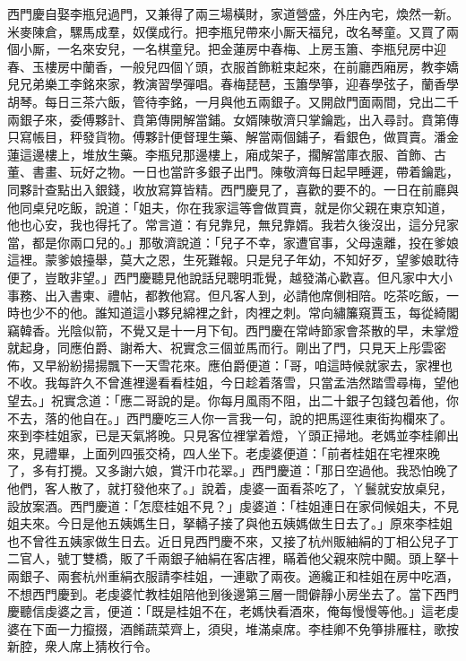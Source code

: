 西門慶自娶李瓶兒過門，又兼得了兩三場橫財，家道營盛，外庄內宅，煥然一新。米麥陳倉，騾馬成羣，奴僕成行。把李瓶兒帶來小厮天福兒，改名琴童。又買了兩個小厮，一名來安兒，一名棋童兒。把金蓮房中春梅、上房玉簫、李瓶兒房中迎春、玉樓房中蘭香，一般兒四個丫頭，衣服首飾粧束起來，在前廳西廂房，教李嬌兒兄弟樂工李銘來家，教演習學彈唱。{}春梅琵琶，玉簫學箏，迎春學弦子，蘭香學胡琴。每日三茶六飯，管待李銘，一月與他五兩銀子。又開啟門面兩間，兌出二千兩銀子來，委傅夥計、賁第傳開解當鋪。女婿陳敬濟只掌鑰匙，出入尋討。賁第傳只寫帳目，秤發貨物。傅夥計便督理生藥、解當兩個鋪子，看銀色，做買賣。潘金蓮這邊樓上，堆放生藥。李瓶兒那邊樓上，廂成架子，擱解當庫衣服、首飾、古董、書畫、玩好之物。一日也當許多銀子出門。陳敬濟每日起早睡遲，帶着鑰匙，同夥計查點出入銀錢，收放寫算皆精。西門慶見了，喜歡的要不的。一日在前廳與他同桌兒吃飯，說道：「姐夫，你在我家這等會做買賣，就是你父親在東京知道，他也心安，我也得托了。常言道：有兒靠兒，無兒靠婿。我若久後沒出，這分兒家當，都是你兩口兒的。」{}那敬濟說道：「兒子不幸，家遭官事，父母遠離，投在爹娘這裡。蒙爹娘擡舉，莫大之恩，生死難報。只是兒子年幼，不知好歹，望爹娘耽待便了，豈敢非望。」西門慶聽見他說話兒聰明乖覺，越發滿心歡喜。但凡家中大小事務、出入書柬、禮帖，都教他寫。但凡客人到，必請他席側相陪。吃茶吃飯，一時也少不的他。誰知道這小夥兒綿裡之針，肉裡之刺。常向繡簾窺賈玉，每從綺閣竊韓香。光陰似箭，不覺又是十一月下旬。西門慶在常峙節家會茶散的早，未掌燈就起身，同應伯爵、謝希大、祝實念三個並馬而行。剛出了門，只見天上彤雲密佈，又早紛紛揚揚飄下一天雪花來。應伯爵便道：「哥，咱這時候就家去，家裡也不收。我每許久不曾進裡邊看看桂姐，今日趁着落雪，只當孟浩然踏雪尋梅，望他望去。」祝實念道：「應二哥說的是。你每月風雨不阻，出二十銀子包錢包着他，{}你不去，落的他自在。」西門慶吃三人你一言我一句，說的把馬逕徃東街抅欄來了。來到李桂姐家，已是天氣將晚。只見客位裡掌着燈，丫頭正掃地。老媽並李桂卿出來，見禮畢，上面列四張交椅，四人坐下。老虔婆便道：「前者桂姐在宅裡來晚了，多有打攪。又多謝六娘，賞汗巾花翠。」西門慶道：「那日空過他。我恐怕晚了他們，客人散了，就打發他來了。」說着，虔婆一面看茶吃了，丫鬟就安放桌兒，設放案酒。西門慶道：「怎麼桂姐不見？」虔婆道：「桂姐連日在家伺候姐夫，不見姐夫來。今日是他五姨媽生日，拏轎子接了與他五姨媽做生日去了。」原來李桂姐也不曾徃五姨家做生日去。近日見西門慶不來，又接了杭州販紬絹的丁相公兒子丁二官人，號丁雙橋，販了千兩銀子紬絹在客店裡，瞞着他父親來院中闝。頭上拏十兩銀子、兩套杭州重絹衣服請李桂姐，一連歇了兩夜。適纔正和桂姐在房中吃酒，不想西門慶到。老虔婆忙教桂姐陪他到後邊第三層一間僻靜小房坐去了。當下西門慶聽信虔婆之言，便道：「既是桂姐不在，老媽快看酒來，俺每慢慢等他。」這老虔婆在下面一力攛掇，酒餚蔬菜齊上，須臾，堆滿桌席。李桂卿不免箏排雁柱，歌按新腔，衆人席上猜枚行令。

